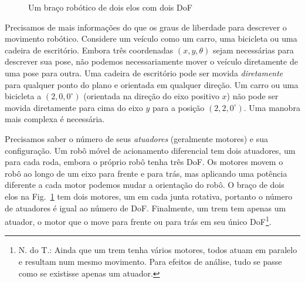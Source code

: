 \begin{figure}
\begin{center}
\end{center}
\caption{Um braço robótico de dois elos com dois DoF}\label{fig.two-link}
\end{figure}

Precisamos de mais informações do que os graus de liberdade para descrever o movimento robótico. Considere um veículo como um carro, uma bicicleta ou uma cadeira de escritório. Embora três coordenadas $(x,y,\theta)$ sejam necessárias para descrever sua pose, não podemos necessariamente mover o veículo diretamente de uma pose para outra. Uma cadeira de escritório pode ser movida \emph{diretamente} para qualquer ponto do plano e orientada em qualquer direção. Um carro ou uma bicicleta a $(2,0,0^\circ)$ (orientada na direção do eixo positivo $x$) não pode ser movida diretamente para cima do eixo $y$ para a posição $(2,2,0^\circ)$. Uma manobra mais complexa é necessária.

Precisamos saber o número de seus \emph{atuadores} (geralmente motores) e sua configuração. Um robô móvel de acionamento diferencial tem dois atuadores, um para cada roda, embora o próprio robô tenha três DoF. Os motores movem o robô ao longo de um eixo para frente e para trás, mas aplicando uma potência diferente a cada motor podemos mudar a orientação do robô. O braço de dois elos na Fig.~\ref{fig.two-link} tem dois motores, um em cada junta rotativa, portanto o número de atuadores é igual ao número de DoF. Finalmente, um trem tem apenas um atuador, o motor que o move para frente ou para trás em seu único DoF\footnote{N. do T.: Ainda que um trem tenha vários motores, todos atuam em paralelo e resultam num mesmo movimento. Para efeitos de análise, tudo se passe como se existisse apenas um atuador.}.

